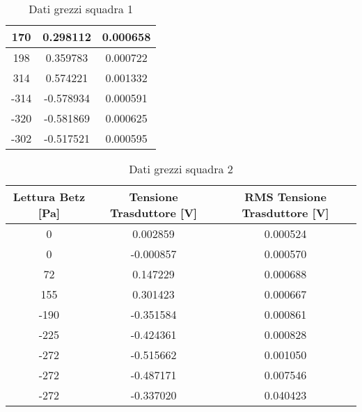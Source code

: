 \begin{table}[h]
\begin{tabular}{|c|c|c|}
170                   & 0.298112                     & 0.000658                         \\ \hline
198                   & 0.359783                     & 0.000722                         \\ \hline
314                   & 0.574221                     & 0.001332                         \\ \hline
-314                  & -0.578934                    & 0.000591                         \\ \hline
-320                  & -0.581869                    & 0.000625                         \\ \hline
-302                  & -0.517521                    & 0.000595                         \\ \hline
\end{tabular}
\caption{Dati grezzi squadra 1}
\end{table}
\newpage
\begin{table}[ht]
\centering
\begin{tabular}{|c|c|c|}
\hline
Lettura Betz {[}Pa{]} & Tensione Trasduttore {[}V{]} & RMS Tensione Trasduttore {[}V{]} \\ \hline
0              & 0.002859                     & 0.000524                         \\ \hline
0              & -0.000857                    & 0.000570                         \\ \hline
72             & 0.147229                     & 0.000688                         \\ \hline
155            & 0.301423                     & 0.000667                         \\ \hline
-190           & -0.351584                    & 0.000861                         \\ \hline
-225           & -0.424361                    & 0.000828                         \\ \hline
-272           & -0.515662                    & 0.001050                         \\ \hline
-272           & -0.487171                    & 0.007546                         \\ \hline
-272           & -0.337020                    & 0.040423                         \\ \hline
\end{tabular}
\caption{Dati grezzi squadra 2}
\end{table}
